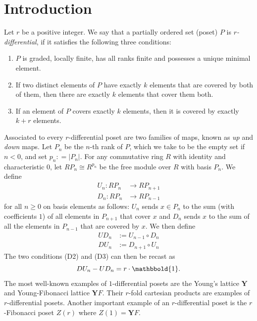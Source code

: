 \section{Introduction}           
Let $r$ be a positive integer. We say that a partially ordered     set (poset) $ P $ is \emph{$ r$-differential}, if it satisfies the following three conditions:    
\begin{enumerate} 
\item[(D1)]$P$ is graded, locally finite, has all ranks finite and possesses a unique minimal element.    
\item[(D2)]If two distinct elements of $P$ have exactly $k$ elements
that are covered by both of them, then there are  exactly $k$ elements
that cover them both.      
\item[(D3)] If an element of $P$ covers exactly  $k$ elements, then it is covered by exactly $k+r$  elements.                                             
\end{enumerate}
Associated to every $ r $-differential poset are two families of maps, known as \textit{up} and \textit{down} maps. Let $ P_{n} $ be the $ n$-th rank of $ P $, which we take to be the empty set if $ n < 0 $, and set $ p_{n} : = | P_{n} |$. For any commutative ring $ R$ with identity and characteristic $ 0 $, let $ 
RP_{n} \cong R^{p_{n}}$ be the free module over $ R $ with basis $ P_{n} $. We define 
$$
\begin{aligned}
U_n : RP_{n} & \rightarrow RP_{n+1}\\
D_n :  RP_{n}  & \rightarrow RP_{n-1}
\end{aligned}
$$
for all $ n \geq 0 $ on basis elements as follows:  $ U_{n} $ sends  $ x \in P_{n} $ to the sum (with coefficients $1$) of all elements in $ P_{n+1} $ that cover $ x $ and $ D_{n} $ sends $ x $ to the sum of all the elements in $ P_{n-1} $ that are covered by $ x $.  We then define
$$
\begin{aligned}
UD_n &:=U_{n-1} \circ D_n \\
DU_n &:=D_{n+1} \circ U_n
\end{aligned}
$$
The two conditions (D2) and (D3) can then be recast as 
$$    DU_{n}  -   UD_{n} = r \cdot \mathbbold{1} . $$ 
The most well-known examples of $ 1 $-differential posets are the Young's lattice $ \mathbf{Y} $ and Young-Fibonacci lattice $  \mathbf{Y}F $.  Their $ r $-fold cartesian products are examples of  $r$-differential posets. Another important example of an $ r$-differential poset is the $ r $-Fibonacci poset $ Z(r) $ where   $ Z(1) = \mathbf{Y} F$.   


